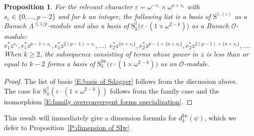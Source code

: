 \documentclass[12pt]{amsart}
\newtheorem{proposition}[subsection]{Proposition}
\theoremstyle{definition}
\numberwithin{equation}{subsection}
\def\calO{\mathcal{O}}
\def\rmS{\mathrm{S}}
\newcommand{\Iw}{\mathrm{Iw}}
\begin{document}
\begin{proposition}
\label{P:power basis}
For the relevant character $\varepsilon = \omega^{-s_\varepsilon} \times \omega^{a+s_\varepsilon}$ with $s_\varepsilon \in \{0, \dots, p-2\}$ and for $k$ an integer, the following list is a basis of $\rmS^{\dagger, (\varepsilon)}$ as a Banach $\Lambda^{\leq 1/p}$-module and also a basis of $\rmS_{k}^\dagger\big(\varepsilon\cdot (1\times \omega^{2-k})\big)$ as a Banach $\calO$-module:
\begin{equation}
\label{E:basis of Sdagger}e_1^* z^{s_\varepsilon}, e_1^* z^{p-1+s_\varepsilon},e_1^* z^{2(p-1)+s_\varepsilon}, \dots;\; e_2^* z^{\{a+s_\epsilon\}}, e_2^* z^{p-1+\{a+s_\epsilon\}},e_2^* z^{2(p-1)+\{a+s_\epsilon\}}, \dots.
\end{equation}
When $k\geq 2$, the subsequence consisting of terms whose power in $z$ is less than or equal to $k-2$ forms a basis of $\rmS_k^\Iw\big(\varepsilon\cdot(1\times \omega^{2-k})\big)$ as an $\calO$-module.
\end{proposition}
\begin{proof}
The list of basis \eqref{E:basis of Sdagger} follows from the discussion above.  The case for $\rmS_k^{\dagger}(\varepsilon\cdot (1\times \omega^{2-k}))$ follows from the family case and the isomorphism \eqref{E:family overconvergent forms specialization}.
\end{proof}
This result will immediately give a dimension formula for $d_k^\Iw(\psi)$, which we defer to Proposition~\ref{P:dimension of SIw}.
\end{document}
